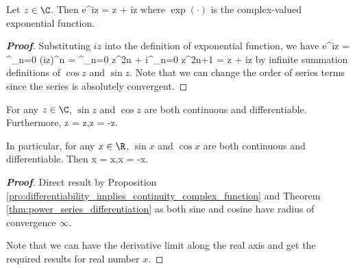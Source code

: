 \begin{theorem}\label{thm:euler_formula_exponential}
Let $z\in \C$. Then
\be
e^{iz} = \cos z + i\sin z
\ee
where $\exp(\cdot)$ is the complex-valued exponential function.
\end{theorem}

\begin{proof}[\bf Proof]
Substituting $iz$ into the definition of exponential function, we have
\be
e^{iz} = \sum^\infty_{n=0} (iz)^n = \sum^\infty_{n=0}  z^{2n} + i\sum^\infty_{n=0}  z^{2n+1} = \cos z + i\sin z
\ee
by infinite summation definitions of $\cos z$ and $\sin z$. Note that we can change the order of series terms since the series is absolutely convergent.
\end{proof}




\begin{proposition}\label{pro:sine_cosine_continuous_differentiable}
For any $z\in \C$, $\sin z$ and $\cos z$ are both continuous and differentiable. Furthermore,
\be
{} \sin z = \cos z,\qquad {}\cos z = -\sin z.
\ee

In particular, for any $x\in \R$, $\sin x$ and $\cos x$ are both continuous and differentiable. Then
\be
{} \sin x = \cos x,\qquad {}\cos x = -\sin x.
\ee
\end{proposition}

\begin{proof}[\bf Proof]
Direct result by Proposition \ref{pro:differentiability_implies_continuity_complex_function} and Theorem \ref{thm:power_series_differentiation} as both sine and cosine have radius of convergence $\infty$.

Note that we can have the derivative limit along the real axis and get the required results for real number $x$.
\end{proof}






